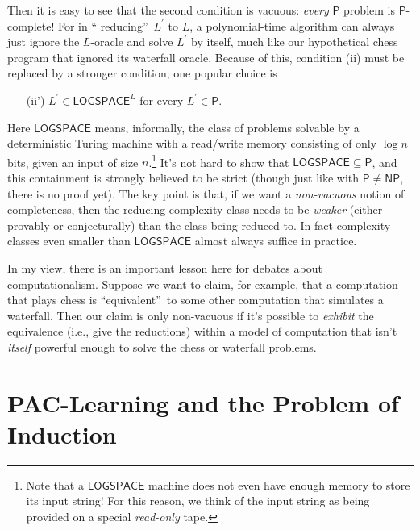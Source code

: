 \documentclass[12pt,onecolumn]{article}%
\begin{document}
Then it is easy to see that the second condition is vacuous: \textit{every}
$\mathsf{P}$ problem is $\mathsf{P}$-complete! For in \textquotedblleft
reducing\textquotedblright\  $L^{\prime}$ to $L$, a polynomial-time algorithm
can always just ignore the $L$-oracle and solve $L^{\prime}$ by itself, much
like our hypothetical chess program that ignored its waterfall oracle.
 Because of this, condition (ii) must be replaced by a stronger condition;
one popular choice is

\begin{enumerate}
\item[(ii')] $L^{\prime}\in\mathsf{LOGSPACE}^{L}$ for every $L^{\prime}%
\in\mathsf{P}$.
\end{enumerate}

Here $\mathsf{LOGSPACE}$ means, informally, the class of problems solvable by
a deterministic Turing machine with a read/write memory consisting of only
$\log n$ bits, given an input of size $n$.\footnote{Note that a
$\mathsf{LOGSPACE}$ machine does not even have enough memory to store its
input string! For this reason, we think of the input string as being
provided on a special \textit{read-only} tape.} It's not hard to show that
$\mathsf{LOGSPACE}\subseteq\mathsf{P}$, and this containment is strongly
believed to be strict (though just like with $\mathsf{P}\neq\mathsf{NP}$,
there is no proof yet). The key point is that, if we want a
\textit{non-vacuous} notion of completeness, then the reducing complexity
class needs to be \textit{weaker} (either provably or conjecturally) than the
class being reduced to. In fact complexity classes even smaller than
$\mathsf{LOGSPACE}$ almost always suffice in practice.

In my view, there is an important lesson here for debates about
computationalism. Suppose we want to claim, for example, that a computation
that plays chess is \textquotedblleft equivalent\textquotedblright\  to some
other computation that simulates a waterfall. Then our claim is only
non-vacuous if it's possible to \textit{exhibit} the equivalence (i.e., give
the reductions) within a model of computation that isn't \textit{itself}
powerful enough to solve the chess or waterfall problems.

\section{PAC-Learning and the Problem of Induction\label{PAC}}
\end{document}

